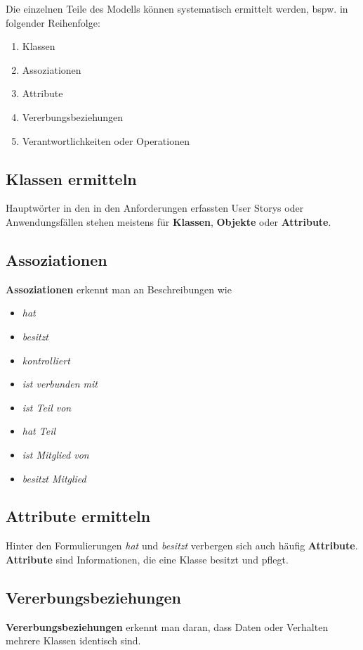 \noindent
Die einzelnen Teile des Modells können systematisch ermittelt werden, bspw. in folgender Reihenfolge:

\begin{enumerate}
    \item Klassen
    \item Assoziationen
    \item Attribute
    \item Vererbungsbeziehungen
    \item Verantwortlichkeiten oder Operationen
\end{enumerate}

\subsection*{Klassen ermitteln}
Hauptwörter in den in den Anforderungen erfassten User Storys oder Anwendungsfällen stehen meistens für \textbf{Klassen}, \textbf{Objekte} oder \textbf{Attribute}.

\subsection*{Assoziationen}
\textbf{Assoziationen} erkennt man an Beschreibungen wie
\begin{itemize}
    \item \textit{hat}
    \item \textit{besitzt}
    \item \textit{kontrolliert}
    \item \textit{ist verbunden mit}
    \item \textit{ist Teil von}
    \item \textit{hat Teil}
    \item \textit{ist Mitglied von}
    \item \textit{besitzt Mitglied}
\end{itemize}

\subsection*{Attribute ermitteln}

\noindent
Hinter den Formulierungen \textit{hat} und \textit{besitzt} verbergen sich auch häufig \textbf{Attribute}.\\

\noindent
\textbf{Attribute} sind Informationen, die eine Klasse besitzt und pflegt.

\subsection*{Vererbungsbeziehungen}
\textbf{Vererbungsbeziehungen} erkennt man daran, dass Daten oder Verhalten mehrere Klassen identisch sind.

